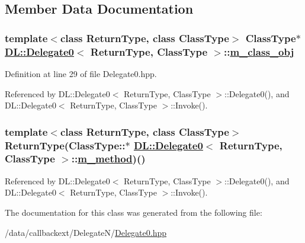 \subsection{Member Data Documentation}
\hypertarget{classDL_1_1Delegate0_r0}{
\subsubsection[m\_\-class\_\-obj]{\setlength{\rightskip}{0pt plus 5cm}template$<$class Return\-Type, class Class\-Type$>$ Class\-Type$\ast$ \hyperlink{classDL_1_1Delegate0}{DL::Delegate0}$<$ Return\-Type, Class\-Type $>$::\hyperlink{classDL_1_1Delegate0_r0}{m\_\-class\_\-obj}}}
\label{classDL_1_1Delegate0_r0}




Definition at line 29 of file Delegate0.hpp.

Referenced by DL::Delegate0$<$ Return\-Type, Class\-Type $>$::Delegate0(), and DL::Delegate0$<$ Return\-Type, Class\-Type $>$::Invoke().\hypertarget{classDL_1_1Delegate0_r1}{
\subsubsection[m\_\-method]{\setlength{\rightskip}{0pt plus 5cm}template$<$class Return\-Type, class Class\-Type$>$ Return\-Type(Class\-Type::$\ast$ \hyperlink{classDL_1_1Delegate0}{DL::Delegate0}$<$ Return\-Type, Class\-Type $>$::\hyperlink{classDL_1_1Delegate0_r1}{m\_\-method})()}}
\label{classDL_1_1Delegate0_r1}




Referenced by DL::Delegate0$<$ Return\-Type, Class\-Type $>$::Delegate0(), and DL::Delegate0$<$ Return\-Type, Class\-Type $>$::Invoke().

The documentation for this class was generated from the following file:\begin{CompactItemize}
\item 
/data/callbackext/Delegate\-N/\hyperlink{Delegate0_8hpp}{Delegate0.hpp}\end{CompactItemize}
